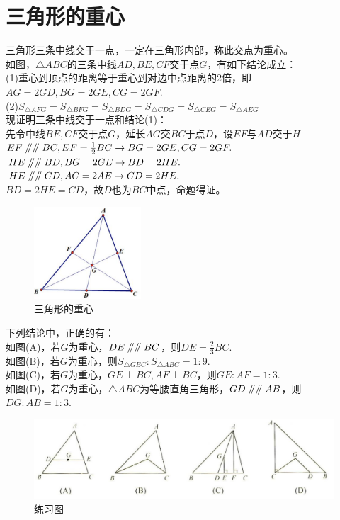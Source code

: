 \documentclass{ecnuthesis}
\newcommand\px{\mathrel{/\mkern-5mu/}}  %
\begin{document}
\section{三角形的重心}
\begin{knowledge}
    三角形三条中线交于一点，一定在三角形内部，称此交点为重心。\\
    如图，$\triangle ABC$的三条中线$AD,BE,CF$交于点$G$，有如下结论成立：\\
    (1)重心到顶点的距离等于重心到对边中点距离的2倍，即$AG=2GD,BG=2GE,CG=2GF$. \\
    (2)$S_{\triangle AFG}=S_{\triangle BFG}=S_{\triangle BDG}=S_{\triangle CDG}=S_{\triangle CEG}=S_{\triangle AEG}$ \\
    现证明三条中线交于一点和结论(1)： \\
    先令中线$BE,CF$交于点$G$，延长$AG$交$BC$于点$D$，设$EF$与$AD$交于$H$\\
    $EF\px \px BC,EF=\frac{1}{2}BC \rightarrow BG=2GE,CG=2GF.$ \\
    $HE\px \px BD,BG=2GE \rightarrow BD=2HE.$ \\
    $HE\px \px CD,AC=2AE \rightarrow CD=2HE.$ \\
    $BD=2HE=CD$，故$D$也为$BC$中点，命题得证。\\
\end{knowledge}
\begin{figure}[H]
\centering
\includegraphics[width=4cm]{picture/809.png}
\caption{三角形的重心}
\end{figure}
\begin{problem}
    下列结论中，正确的有：\\
    如图(A)，若$G$为重心，$DE\px \px BC$，则$DE=\frac{2}{3}BC$. \\
    如图(B)，若$G$为重心，则$S_{\triangle GBC}:S_{\triangle ABC}=1:9$. \\
    如图(C)，若$G$为重心，$GE\perp BC,AF\perp BC$，则$GE:AF=1:3$. \\
    如图(D)，若$G$为重心，$\triangle ABC$为等腰直角三角形，$GD\px \px AB$，则$DG:AB=1:3$. \\
\end{problem}
\begin{figure}[H]
\centering
\includegraphics[width=12cm]{picture/822.png}
\caption{练习图}
\end{figure}
\end{document}

